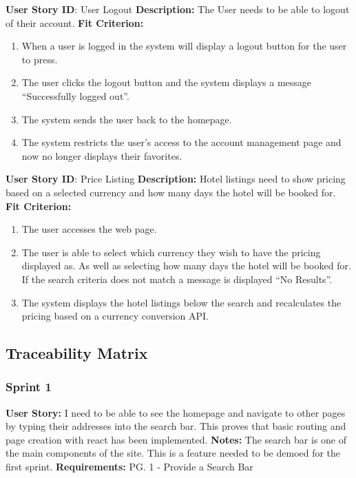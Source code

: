 \documentclass[]{article}
\begin{document}
\noindent
\textbf{User Story ID}: User Logout\newline
\textbf{Description:} The User needs to be able to logout of their account.\newline
\textbf{Fit Criterion:}
\begin{enumerate}
    \item When a user is logged in the system will display a logout button for the user to press.
    \item The user clicks the logout button and the system displays a message “Successfully logged out”.
    \item The system sends the user back to the homepage.
    \item The system restricts the user’s access to the account management page and now no longer displays their favorites.
\end{enumerate}

\noindent
\textbf{User Story ID}: Price Listing \newline
\textbf{Description:} Hotel listings need to show pricing based on a selected currency and how many days the hotel will be booked for.\newline
\textbf{Fit Criterion:}
\begin{enumerate}
    \item The user accesses the web page.
    \item The user is able to select which currency they wish to have the pricing displayed as. As well as selecting how many days the hotel will be booked for. If the search criteria does not match a message is displayed “No Results”. 
    \item The system displays the hotel listings below the search and recalculates the pricing based on a currency conversion API.
\end{enumerate}

\subsection{Traceability Matrix}
\subsubsection{Sprint 1}
\noindent
\textbf{User Story:} I need to be able to see the homepage and navigate to other pages by typing their addresses into the search bar. This proves that basic routing and page creation with react has been implemented. \newline
\textbf{Notes:} The search bar is one of the main components of the site. This is a feature needed to be demoed for the first sprint. \newline
\textbf{Requirements:} PG. 1 - Provide a Search Bar \newline
\end{document}
